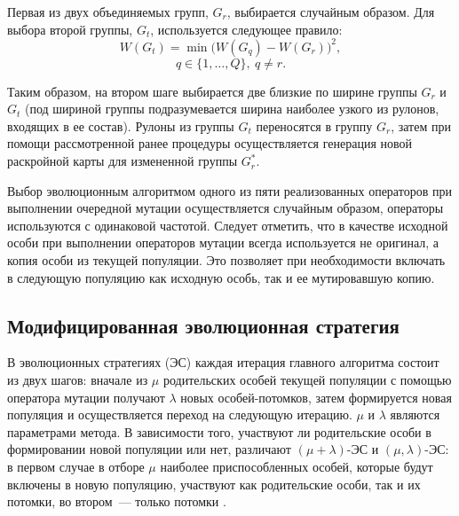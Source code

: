 \documentclass[12pt]{article}
\begin{document}
Первая из двух объединяемых групп, $G_r$, выбирается случайным образом. 
Для выбора второй группы, $G_t$, используется следующее правило:
\[ W(G_t)=\min{\bigl( W(G_q) - W(G_r) \bigr)^2}, \]
\[ q \in \{1,\ldots,Q\}, \: q \neq r. \]

Таким образом, на втором шаге выбирается две близкие по ширине группы $G_r$ и 
$G_t$ (под шириной группы подразумевается ширина наиболее узкого из рулонов, 
входящих в ее состав). Рулоны из группы $G_t$ переносятся в группу $G_r$, 
затем при помощи рассмотренной ранее процедуры осуществляется генерация новой 
раскройной карты для измененной группы $G_r^*$.

Выбор эволюционным алгоритмом одного из пяти реализованных операторов при 
выполнении очередной мутации осуществляется случайным образом, операторы 
используются с одинаковой частотой. Следует отметить, что в качестве исходной 
особи при выполнении операторов мутации всегда используется не оригинал, а 
копия особи из текущей популяции. Это позволяет при необходимости включать в 
следующую популяцию как исходную особь, так и ее мутировавшую копию.

\subsection{Модифицированная эволюционная стратегия}

В эволюционных стратегиях (ЭС) каждая итерация главного алгоритма состоит из 
двух шагов: вначале из $\mu$ родительских особей текущей популяции с помощью 
оператора мутации получают $\lambda$ новых особей-потомков, затем формируется 
новая популяция и осуществляется переход на следующую итерацию. $\mu$ и 
$\lambda$ являются параметрами метода. В зависимости того, участвуют ли 
родительские особи в формировании новой популяции или нет, различают 
$(\mu + \lambda)$-ЭС и $(\mu, \lambda)$-ЭС: в первом случае в отборе $\mu$ 
наиболее приспособленных особей, которые будут включены в новую популяцию, 
участвуют как родительские особи, так и их потомки, во втором~--- только 
потомки 
\cite{schwefel95}. 
\end{document}
